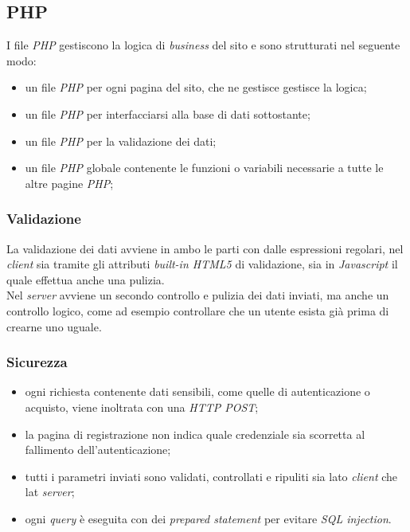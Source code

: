 \documentclass{template}
\begin{document}
	\subsection{PHP}
	I file \textit{PHP} gestiscono la logica di \textit{business} del sito e sono strutturati nel seguente modo:
	\begin{itemize}
		\item un file \textit{PHP} per ogni pagina del sito, che ne gestisce gestisce la logica;
		\item un file \textit{PHP} per interfacciarsi alla base di dati sottostante;
		\item un file \textit{PHP} per la validazione dei dati;
		\item un file \textit{PHP} globale contenente le funzioni o variabili necessarie a tutte le altre pagine \textit{PHP};
	\end{itemize}

    \subsubsection{Validazione}
	La validazione dei dati avviene in ambo le parti con dalle espressioni regolari, nel \textit{client} sia tramite gli attributi \textit{built-in HTML5} di validazione, sia in \textit{Javascript} il quale effettua anche una pulizia. \\
	Nel \textit{server} avviene un secondo controllo e pulizia dei dati inviati, ma anche un controllo logico, come ad esempio controllare che un utente esista già prima di crearne uno uguale. 
	
    \subsubsection{Sicurezza}
	\begin{itemize}
		\item ogni richiesta contenente dati sensibili, come quelle di autenticazione o acquisto, viene inoltrata con una \textit{HTTP POST};
		\item la pagina di registrazione non indica quale credenziale sia scorretta al fallimento dell'autenticazione;
		\item tutti i parametri inviati sono validati, controllati e ripuliti sia lato \textit{client} che lat \textit{server};
		\item ogni \textit{query} è eseguita con dei \textit{prepared statement} per evitare \textit{SQL injection}.
	\end{itemize}
\end{document}
